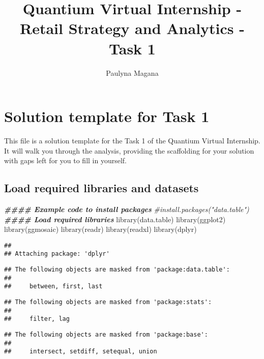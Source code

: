 \documentclass[
]{article}
\title{Quantium Virtual Internship - Retail Strategy and Analytics -
Task 1}
\author{Paulyna Magana}
\date{}
\newenvironment{Shaded}{\begin{snugshade}}{\end{snugshade}}
\newcommand{\CommentTok}[1]{\textcolor[rgb]{0.56,0.35,0.01}{\textit{#1}}}
\newcommand{\DocumentationTok}[1]{\textcolor[rgb]{0.56,0.35,0.01}{\textbf{\textit{#1}}}}
\newcommand{\FunctionTok}[1]{\textcolor[rgb]{0.00,0.00,0.00}{#1}}
\newcommand{\NormalTok}[1]{#1}
\begin{document}
\maketitle

\hypertarget{solution-template-for-task-1}{%
\section{Solution template for Task
1}\label{solution-template-for-task-1}}

This file is a solution template for the Task 1 of the Quantium Virtual
Internship. It will walk you through the analysis, providing the
scaffolding for your solution with gaps left for you to fill in
yourself.

\hypertarget{load-required-libraries-and-datasets}{%
\subsection{Load required libraries and
datasets}\label{load-required-libraries-and-datasets}}

\begin{Shaded}
\begin{Highlighting}[]
\DocumentationTok{\#\#\#\# Example code to install packages}
\CommentTok{\#install.packages("data.table")}
\DocumentationTok{\#\#\#\# Load required libraries}
\FunctionTok{library}\NormalTok{(data.table)}
\FunctionTok{library}\NormalTok{(ggplot2)}
\FunctionTok{library}\NormalTok{(ggmosaic)}
\FunctionTok{library}\NormalTok{(readr)}
\FunctionTok{library}\NormalTok{(readxl)}
\FunctionTok{library}\NormalTok{(dplyr)}
\end{Highlighting}
\end{Shaded}

\begin{verbatim}
## 
## Attaching package: 'dplyr'
\end{verbatim}

\begin{verbatim}
## The following objects are masked from 'package:data.table':
## 
##     between, first, last
\end{verbatim}

\begin{verbatim}
## The following objects are masked from 'package:stats':
## 
##     filter, lag
\end{verbatim}

\begin{verbatim}
## The following objects are masked from 'package:base':
## 
##     intersect, setdiff, setequal, union
\end{verbatim}
\end{document}
